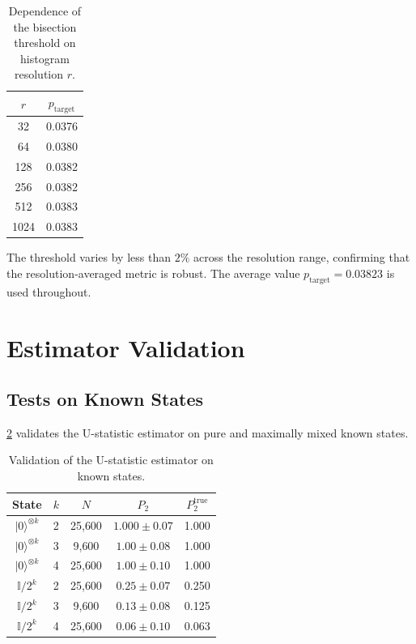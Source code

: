 \documentclass[12pt,a4paper,oneside]{book}
\theoremstyle{plain}
\theoremstyle{definition}
\theoremstyle{remark}
\begin{document}
\begin{table}[H]
\centering
\caption{Dependence of the bisection threshold on histogram resolution $r$.}
\label{tab:resolution}
\begin{tabular}{c|c}
\toprule
$r$ & $p_{\text{target}}$ \\
\midrule
32    & 0.0376 \\
64    & 0.0380 \\
128   & 0.0382 \\
256   & 0.0382 \\
512   & 0.0383 \\
1024  & 0.0383 \\
\bottomrule
\end{tabular}
\end{table}

The threshold varies by less than $2\%$ across the resolution range, confirming that the resolution-averaged metric is robust. The average value $p_{\text{target}} = 0.03823$ is used throughout.

\section{Estimator Validation}
\label{sec:results_estimator}

\subsection{Tests on Known States}

\cref{tab:estimator_validation} validates the U-statistic estimator on pure and maximally mixed known states.

\begin{table}[H]
\centering
\caption{Validation of the U-statistic estimator on known states.}
\label{tab:estimator_validation}
\begin{tabular}{c|c|c|c|c}
\toprule
State & $k$ & $N$ & $\widehat{P}_2$ & $P_2^{\text{true}}$ \\
\midrule
$|0\rangle^{\otimes k}$ & 2 & 25{,}600 & $1.000 \pm 0.07$ & 1.000 \\
$|0\rangle^{\otimes k}$ & 3 & 9{,}600  & $1.00 \pm 0.08$  & 1.000 \\
$|0\rangle^{\otimes k}$ & 4 & 25{,}600 & $1.00 \pm 0.10$  & 1.000 \\
$\mathbb{I}/2^k$ & 2 & 25{,}600 & $0.25 \pm 0.07$  & 0.250 \\
$\mathbb{I}/2^k$ & 3 & 9{,}600  & $0.13 \pm 0.08$  & 0.125 \\
$\mathbb{I}/2^k$ & 4 & 25{,}600 & $0.06 \pm 0.10$  & 0.063 \\
\bottomrule
\end{tabular}
\end{table}
\end{document}
